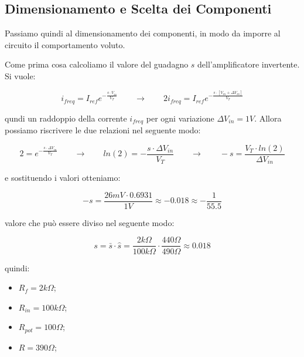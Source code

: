 

\subsection*{Dimensionamento e Scelta dei Componenti}


Passiamo quindi al dimensionamento dei componenti, in modo da imporre al circuito il
comportamento voluto.

Come prima cosa calcoliamo il valore del guadagno $s$ dell'amplificatore invertente.
Si vuole:

\begin{displaymath}
    i_{freq}=I_{ref}e^{-\frac{s\cdot V_{in}}{V_T}}
    \qquad
    \rightarrow
    \qquad
    2i_{freq}=I_{ref}e^{-\frac{s\cdot[V_{in}+\Delta V_{in}]}{V_T}}
\end{displaymath}

qundi un raddoppio della corrente $i_{freq}$ per ogni variazione $\Delta V_{in}=1V$.
Allora possiamo riscrivere le due relazioni nel seguente modo:

\begin{displaymath}
    2=e^{-\frac{s\cdot\Delta V_{in}}{V_T}}
    \qquad
    \rightarrow
    \qquad
    ln(2)=-\frac{s\cdot\Delta V_{in}}{V_T}
    \qquad
    \rightarrow
    \qquad
    -s=\frac{V_T\cdot ln(2)}{\Delta V_{in}}
\end{displaymath}

e sostituendo i valori otteniamo:

\begin{displaymath}
    -s=\frac{26mV\cdot 0.6931}{1V}\approx-0.018\approx-\frac{1}{55.5}
\end{displaymath}

valore che può essere diviso nel seguente modo:

\begin{displaymath}
    s=\bar{s}\cdot\hat{s}=\frac{2k\Omega}{100k\Omega}\cdot\frac{440\Omega}{490\Omega}
    \approx 0.018
\end{displaymath}

quindi:


\begin{itemize}
    \item $R_f = 2k\Omega$;
    \item $R_{in} = 100k\Omega$;
    \item $R_{pot} = 100\Omega$;
    \item $R = 390\Omega$;
\end{itemize}

